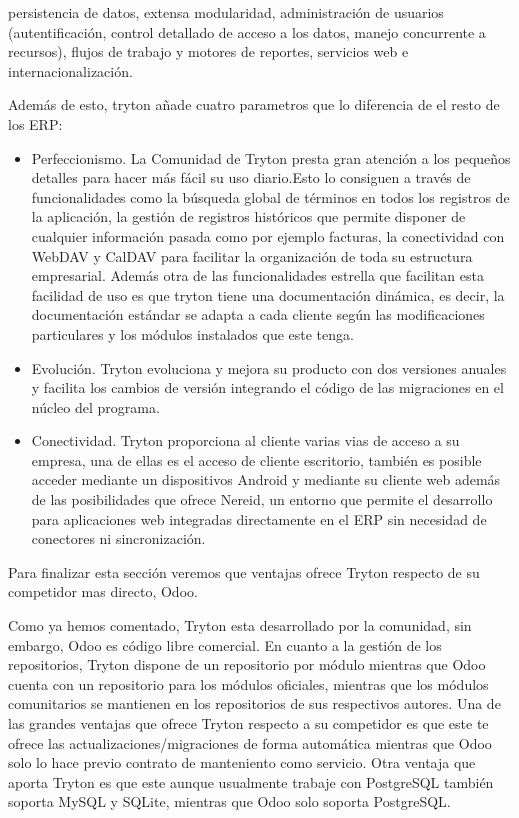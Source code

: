 \documentclass{article}
\begin{document}
persistencia de datos, extensa modularidad, administración de usuarios (autentificación, control detallado de acceso a los datos, manejo concurrente a recursos), flujos de trabajo y motores de reportes, servicios web e internacionalización.

Además de esto, tryton añade cuatro parametros que lo diferencia de el resto de  los ERP:

\begin{itemize}
    \item Perfeccionismo. La Comunidad de Tryton presta gran atención a los pequeños detalles para hacer más fácil su uso 	diario.Esto lo consiguen a través de funcionalidades como la búsqueda global de términos en todos los registros de la aplicación, la gestión de registros históricos que permite disponer de cualquier información pasada como por ejemplo facturas, la conectividad con WebDAV y CalDAV para facilitar la organización de toda su estructura empresarial. Además otra de las funcionalidades estrella que facilitan esta facilidad de uso es que tryton tiene una documentación dinámica, es decir, la documentación estándar se adapta a cada cliente según las modificaciones particulares y los módulos instalados que este tenga.
    \item Evolución.  Tryton evoluciona y mejora  su producto con dos versiones anuales y facilita los cambios de versión integrando el código de las migraciones en el núcleo del programa.
    \item Conectividad. Tryton proporciona al cliente varias vias de acceso a su empresa, una de ellas es el acceso de cliente escritorio, también es posible acceder mediante un dispositivos Android y mediante su cliente web además de las  posibilidades que ofrece Nereid, un entorno que permite el desarrollo para aplicaciones web integradas directamente en el ERP sin necesidad de conectores ni sincronización.
\end{itemize}

Para finalizar esta sección veremos que ventajas ofrece Tryton respecto de su competidor mas directo, Odoo.

Como ya hemos comentado, Tryton esta desarrollado por la comunidad, sin embargo, Odoo es código libre comercial. 
En cuanto a la gestión de los repositorios, Tryton dispone de un repositorio por módulo mientras que Odoo cuenta con un repositorio para los módulos oficiales, mientras que los módulos comunitarios se mantienen en los repositorios de sus respectivos autores.
Una de las grandes ventajas que ofrece Tryton respecto a su competidor es que este te ofrece las actualizaciones/migraciones de forma automática mientras que Odoo solo lo hace previo contrato de manteniento como servicio.
Otra ventaja que aporta Tryton es que este aunque usualmente trabaje con PostgreSQL también soporta MySQL y SQLite, mientras que Odoo solo soporta PostgreSQL.
\end{document}
